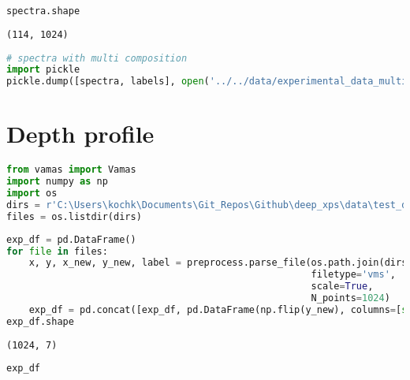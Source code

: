 \begin{lstlisting}[language=Python]
spectra.shape
\end{lstlisting}

\begin{lstlisting}
(114, 1024)
\end{lstlisting}

\begin{lstlisting}[language=Python]
# spectra with multi composition
import pickle
pickle.dump([spectra, labels], open('../../data/experimental_data_multi.pkl', 'wb'))
\end{lstlisting}

\hypertarget{depth-profile}{%
\section{Depth profile}\label{depth-profile}}

\begin{lstlisting}[language=Python]
from vamas import Vamas
import numpy as np
import os
dirs = r'C:\Users\kochk\Documents\Git_Repos\Github\deep_xps\data\test_data\Selected_Spectra\gradient_thickness'
files = os.listdir(dirs)
\end{lstlisting}

\begin{lstlisting}[language=Python]
exp_df = pd.DataFrame()
for file in files:
    x, y, x_new, y_new, label = preprocess.parse_file(os.path.join(dirs, file), 
                                                      filetype='vms',
                                                      scale=True,
                                                      N_points=1024)
    exp_df = pd.concat([exp_df, pd.DataFrame(np.flip(y_new), columns=[str('_'.join(label)+'_'+file.split('_')[2]+'_separate')])], axis=1)
exp_df.shape
\end{lstlisting}

\begin{lstlisting}
(1024, 7)
\end{lstlisting}

\begin{lstlisting}[language=Python]
exp_df
\end{lstlisting}

